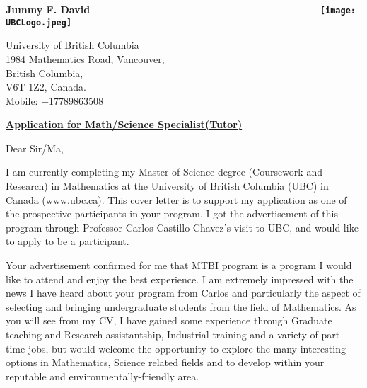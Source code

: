 \documentclass{letter} %
\begin{document}
\signature{David Jummy Funke \href{mailto: jummy30@math.ubc.ca}{jummy30@math.ubc.ca} }           %
\longindentation=0pt                       %
\let\raggedleft\raggedright                %
 

\begin{flushleft}
{\large\bf Jummy F. David $\qquad \qquad \qquad \qquad \qquad \qquad \qquad \qquad \qquad \qquad \qquad \  \ \  \ ${\texttt{[image: UBCLogo.jpeg]}}}
\end{flushleft}

\begin{flushright}
\hfill University of British Columbia\\
\hfill 1984 Mathematics Road, Vancouver,\\
\hfill British Columbia,\\
\hfill V6T 1Z2, Canada.\\
\hfill Mobile: +17789863508
\end{flushright} 
\vfill %
 
\opening{} 

\begin{center}
{\bf{\underline{Application for Math/Science Specialist(Tutor)}}}
\end{center}
Dear Sir/Ma,

 I am currently completing my Master of Science degree (Coursework and Research) in Mathematics at the University of British Columbia (UBC) in Canada (\href{http://www.ubc.ca}{www.ubc.ca}). This cover letter is to support my application as one of the prospective participants in your program. I got the advertisement of this program through Professor Carlos Castillo-Chavez's visit to UBC, and would like to apply to be a participant.

\noindent Your advertisement confirmed for me that MTBI program is a program I would like to attend and enjoy the best experience. I am extremely impressed with the news I have heard about your program from Carlos  and particularly  the aspect of selecting and bringing undergraduate students from the field of Mathematics. As you will see from my CV, I have gained some experience through Graduate teaching and Research assistantship, Industrial training and a variety of part-time jobs, but would welcome the opportunity to explore the many interesting options in Mathematics, Science related fields and to develop within your reputable and environmentally-friendly area.
\end{document}
